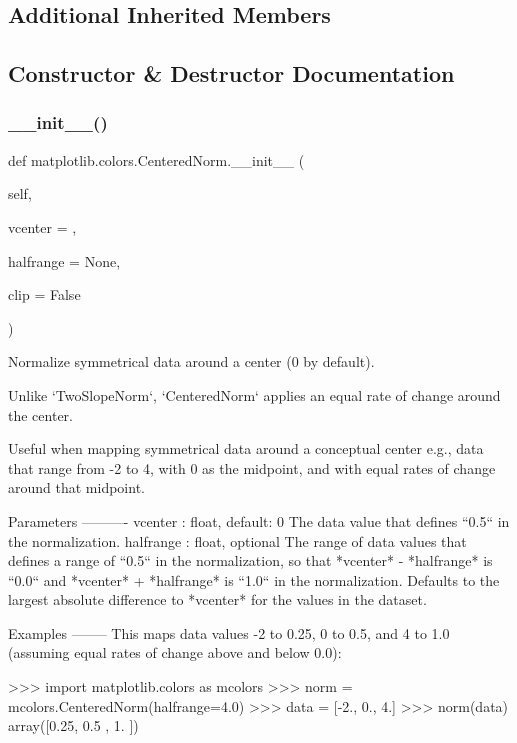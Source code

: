 \subsection*{Additional Inherited Members}


\subsection{Constructor \& Destructor Documentation}
\mbox{\label{classmatplotlib_1_1colors_1_1CenteredNorm_a4b01eaf1c98c8708326040b6cba5a4c0}} 
\subsubsection{\texorpdfstring{\+\_\+\+\_\+init\+\_\+\+\_\+()}{\_\_init\_\_()}}
{\footnotesize\ttfamily def matplotlib.\+colors.\+Centered\+Norm.\+\_\+\+\_\+init\+\_\+\+\_\+ (\begin{DoxyParamCaption}\item[{}]{self,  }\item[{}]{vcenter = {},  }\item[{}]{halfrange = {\ttfamily None},  }\item[{}]{clip = {\ttfamily False} }\end{DoxyParamCaption})}

\begin{DoxyVerb}Normalize symmetrical data around a center (0 by default).

Unlike `TwoSlopeNorm`, `CenteredNorm` applies an equal rate of change
around the center.

Useful when mapping symmetrical data around a conceptual center
e.g., data that range from -2 to 4, with 0 as the midpoint, and
with equal rates of change around that midpoint.

Parameters
----------
vcenter : float, default: 0
    The data value that defines ``0.5`` in the normalization.
halfrange : float, optional
    The range of data values that defines a range of ``0.5`` in the
    normalization, so that *vcenter* - *halfrange* is ``0.0`` and
    *vcenter* + *halfrange* is ``1.0`` in the normalization.
    Defaults to the largest absolute difference to *vcenter* for
    the values in the dataset.

Examples
--------
This maps data values -2 to 0.25, 0 to 0.5, and 4 to 1.0
(assuming equal rates of change above and below 0.0):

    >>> import matplotlib.colors as mcolors
    >>> norm = mcolors.CenteredNorm(halfrange=4.0)
    >>> data = [-2., 0., 4.]
    >>> norm(data)
    array([0.25, 0.5 , 1.  ])
\end{DoxyVerb}
 

